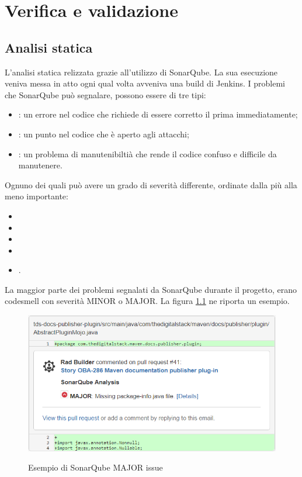 
\chapter{Verifica e validazione}
\label{cap:testing} %

\section{Analisi statica}
L'analisi statica relizzata grazie all'utilizzo di SonarQube.
La sua esecuzione veniva messa in atto ogni qual volta avveniva una build di Jenkins.
I problemi che SonarQube può segnalare, possono essere di tre tipi:
\begin{itemize}
    \item {}: un errore nel codice che richiede di essere corretto il prima immediatamente;
    \item {}: un punto nel codice che è aperto agli attacchi;
    \item {}:  un problema di manutenibiltià che rende il codice confuso e difficile da manutenere.
\end{itemize}
Ognuno dei quali può avere un grado di severità differente, ordinate dalla più alla meno importante:
\begin{itemize}
    \item {}
    \item {}
    \item {}
    \item {}
    \item {}.
\end{itemize}

La maggior parte dei problemi segnalati da SonarQube durante il progetto, erano codesmell con severità MINOR o MAJOR.
La figura \ref{sonarMAJORissue} ne riporta un esempio.
\begin{figure}[H]
    \centering
    \includegraphics[width=\textwidth]{immagini/major-issue.png}\\
    \caption{Esempio di SonarQube MAJOR issue}
    \label{sonarMAJORissue}
\end{figure}

